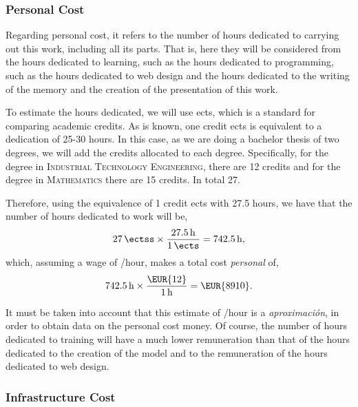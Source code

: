\subsubsection{Personal Cost}

Regarding personal cost, it refers to the number of hours dedicated to carrying
out this work, including all its parts. That is, here they will be considered
from the hours dedicated to learning, such as the hours dedicated to
programming, such as the hours dedicated to web design and the hours dedicated
to the writing of the memory and the creation of the presentation of this work.

To estimate the hours dedicated, we will use \gls{ects}, which is a standard
for comparing academic credits. As is known, one credit \gls{ects} is
equivalent to a dedication of 25-30 hours. In this case, as we are doing a
bachelor thesis of two degrees, we will add the credits allocated to each
degree. Specifically, for the degree in \textsc{Industrial Technology
  Engineering}, there are 12 credits and for the degree in \textsc{Mathematics}
there are 15 credits. In total \SI{27}{\ectss}.

Therefore, using the equivalence of 1 credit \gls{ects} with 27.5 hours, we
have that the number of hours dedicated to work will be,
\begin{equation}
  \SI{27}{\ectss} \times \frac{\SI{27.5}{\hour}}{\SI{1}{\ects}} =
  \SI{742.5}{\hour},
\end{equation}
which, assuming a wage of /hour, makes a total cost \emph{personal} of,
\begin{equation}
  \SI{742.5}{\hour} \times \frac{\text{\EUR{12}}}{\SI{1}{\hour}} =
  \text{\EUR{\num{8910}}}.
\end{equation}

\begin{remarkBox}
  It must be taken into account that this estimate of /hour is a
  \emph{aproximación}, in order to obtain data on the personal cost money. Of
  course, the number of hours dedicated to training will have a much lower
  remuneration than that of the hours dedicated to the creation of the model
  and to the remuneration of the hours dedicated to web design.
\end{remarkBox}

\subsubsection{Infrastructure Cost}

